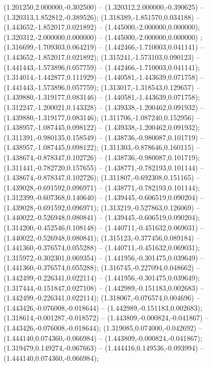  (1.201250,2.000000,-0.302500) -- (1.320312,2.000000,-0.390625) -- (1.320313,1.852812,-0.389526);
 (1.318389,-1.851570,0.034188) -- (1.443652,-1.852017,0.021892) -- (1.445000,-2.000000,0.000000);
 (1.320312,-2.000000,0.000000) -- (1.445000,-2.000000,0.000000) ;
 (1.316699,-1.709303,0.064219) -- (1.442466,-1.710003,0.041141) -- (1.443652,-1.852017,0.021892);
 (1.315241,-1.573103,0.090123) -- (1.441443,-1.573896,0.057759) -- (1.442466,-1.710003,0.041141);
 (1.314014,-1.442877,0.111929) -- (1.440581,-1.443639,0.071758) -- (1.441443,-1.573896,0.057759);
 (1.313017,-1.318543,0.129657) -- (1.439880,-1.319177,0.083146) -- (1.440581,-1.443639,0.071758);
 (1.312247,-1.200021,0.143328) -- (1.439338,-1.200462,0.091932) -- (1.439880,-1.319177,0.083146);
 (1.311706,-1.087240,0.152956) -- (1.438957,-1.087445,0.098122) -- (1.439338,-1.200462,0.091932);
 (1.311391,-0.980135,0.158549) -- (1.438736,-0.980087,0.101719) -- (1.438957,-1.087445,0.098122);
 (1.311303,-0.878646,0.160115) -- (1.438674,-0.878347,0.102726) -- (1.438736,-0.980087,0.101719);
 (1.311441,-0.782720,0.157655) -- (1.438771,-0.782193,0.101144) -- (1.438674,-0.878347,0.102726);
 (1.311807,-0.692308,0.151165) -- (1.439028,-0.691592,0.096971) -- (1.438771,-0.782193,0.101144);
 (1.312399,-0.607368,0.140640) -- (1.439445,-0.606519,0.090204) -- (1.439028,-0.691592,0.096971);
 (1.313219,-0.527863,0.126069) -- (1.440022,-0.526948,0.080841) -- (1.439445,-0.606519,0.090204);
 (1.314200,-0.452546,0.108148) -- (1.440711,-0.451632,0.069031) -- (1.440022,-0.526948,0.080841);
 (1.315123,-0.377456,0.089184) -- (1.441360,-0.376574,0.055288) -- (1.440711,-0.451632,0.069031);
 (1.315972,-0.302301,0.069354) -- (1.441956,-0.301475,0.039649) -- (1.441360,-0.376574,0.055288);
 (1.316745,-0.227094,0.048662) -- (1.442499,-0.226341,0.022114) -- (1.441956,-0.301475,0.039649);
 (1.317444,-0.151847,0.027108) -- (1.442989,-0.151183,0.002683) -- (1.442499,-0.226341,0.022114);
 (1.318067,-0.076574,0.004696) -- (1.443426,-0.076008,-0.018644) -- (1.442989,-0.151183,0.002683);
 (1.318614,-0.001287,-0.018572) -- (1.443809,-0.000824,-0.041867) -- (1.443426,-0.076008,-0.018644);
 (1.319085,0.074000,-0.042692) -- (1.444140,0.074360,-0.066984) -- (1.443809,-0.000824,-0.041867);
 (1.319479,0.149274,-0.067663) -- (1.444416,0.149536,-0.093994) -- (1.444140,0.074360,-0.066984);
